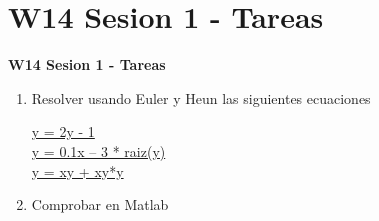 \documentclass{beamer}
\begin{document}
\section{W14 Sesion 1 - Tareas }

\begin{frame}


\textbf{W14 Sesion 1 - Tareas}


\begin{enumerate}
\item Resolver usando Euler y Heun las siguientes ecuaciones

 
\href{https://www.youtube.com/watch?v=lob94xNqq0w}{y =  2y - 1} \\

 
\href{https://www.youtube.com/watch?v=RR_VprIzSGM}{y = 0.1x – 3 * raiz(y)} \\


\href{https://www.youtube.com/watch?v=Ja9n0XLm3ww}{y = xy + xy*y}
 

\item
	Comprobar en Matlab


\end{enumerate} 


\end{frame}
\end{document}
